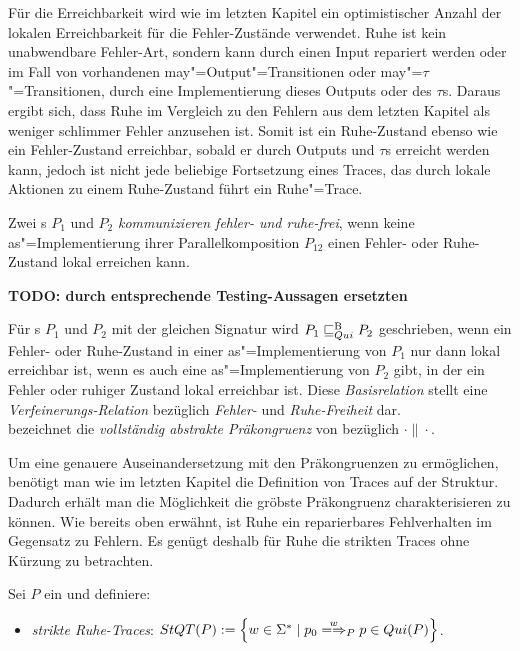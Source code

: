 Für die Erreichbarkeit wird wie im letzten Kapitel ein optimistischer Anzahl
der lokalen Erreichbarkeit für die Fehler-Zustände verwendet. Ruhe ist kein
unabwendbare \glqq Fehler-Art\grqq{}, sondern kann durch einen Input repariert
werden oder im Fall von vorhandenen may"=Output"=Transitionen oder
may"=$\tau$"=Transitionen, durch eine Implementierung dieses Outputs oder des
$\tau$s. Daraus ergibt sich, dass Ruhe im Vergleich zu den Fehlern aus dem
letzten Kapitel als weniger \glqq schlimmer Fehler\grqq{} anzusehen ist. Somit
ist ein Ruhe-Zustand ebenso wie ein Fehler-Zustand erreichbar, sobald er durch
Outputs und $\tau$s erreicht werden kann, jedoch ist nicht jede beliebige
Fortsetzung eines Traces, das durch lokale Aktionen zu einem Ruhe-Zustand führt
ein Ruhe"=Trace.

\begin{Def}
  Zwei \MEIO{}s $P_1$ und $P_2$ \emph{kommunizieren fehler- und ruhe-frei},
  wenn keine as"=Implementierung ihrer Parallelkomposition $P_{12}$ einen
  Fehler- oder Ruhe-Zustand lokal erreichen kann.
\end{Def}

\textcolor{lgray}{
\textbf{TODO: durch entsprechende Testing-Aussagen ersetzten}
\begin{Def}
  \label{QBRelDef}
  Für \MEIO{}s $P_1$ und $P_2$ mit der gleichen Signatur wird $P_1 \sqsubseteq  _{Qui}^\mathrm{B} P_2$
  geschrieben, wenn ein Fehler- oder Ruhe-Zustand in einer as"=Implementierung
  von $P_1$ nur dann lokal erreichbar ist, wenn es auch eine
  as"=Implementierung von $P_2$ gibt, in der ein Fehler oder ruhiger Zustand
  lokal erreichbar ist. Diese \emph{Basisrelation} stellt eine
  \emph{Verfeinerungs-Relation} bezüglich \emph{Fehler-} und
  \emph{Ruhe-Freiheit} dar.\\
  \QCRel{} bezeichnet die \emph{vollständig abstrakte Präkongruenz} von
  \QBRel{} bezüglich $\cdot\|\cdot$.
\end{Def}
}

Um eine genauere Auseinandersetzung mit den Präkongruenzen zu ermöglichen,
benötigt man wie im letzten Kapitel die Definition von Traces auf der Struktur.
Dadurch erhält man die Möglichkeit die gröbste Präkongruenz charakterisieren zu
können. Wie bereits oben erwähnt, ist Ruhe ein reparierbares \glqq
Fehlverhalten\grqq{} im Gegensatz zu Fehlern. Es genügt deshalb für Ruhe die
strikten Traces ohne Kürzung zu betrachten.

\begin{Def}
  \label{RuheTraceDef}
  Sei $P$ ein \MEIO{} und definiere:
  \begin{itemize}
    \item \emph{strikte Ruhe-Traces}: $\StQT (P) := \left\{w\in\Sigma ^*\mid
      p_0 \weakmay[w]_P p\in Qui(P)\right\}$.
  \end{itemize}
\end{Def}

